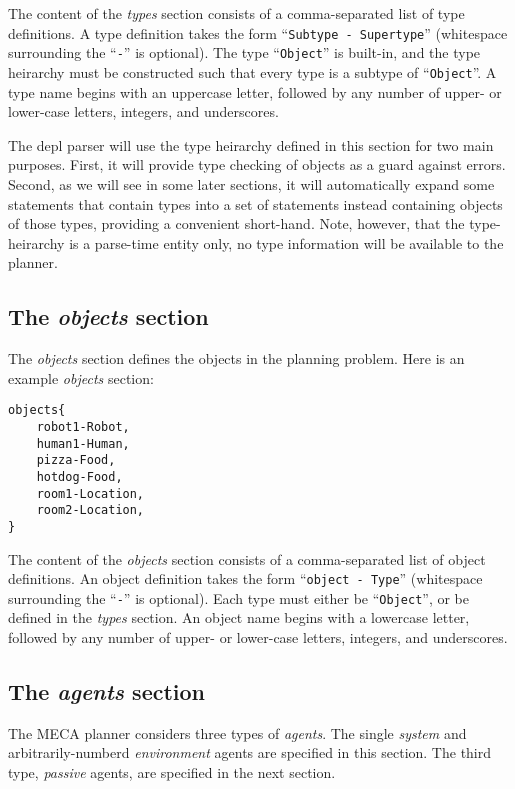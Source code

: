 \documentclass{article}
\begin{document}
The content of the \emph{types} section consists of a comma-separated list of
type definitions. A type definition takes the form
``\texttt{Subtype - Supertype}'' (whitespace surrounding the ``\texttt{-}'' is
optional). The type ``\texttt{Object}'' is built-in, and
the type heirarchy must be constructed such that every type is a subtype of
``\texttt{Object}''.  A type name begins with an uppercase letter, followed
by any number of upper- or lower-case letters, integers, and underscores.

The depl parser will use the type heirarchy defined in this section for two main
purposes. First, it will provide type checking of objects as a guard against errors.
Second, as we will see in some later sections, it will automatically expand some
statements that contain types into a set of statements instead containing
objects of those types, providing a convenient short-hand. Note, however, that
the type-heirarchy is a parse-time entity only, no type information will be
available to the planner.


\subsection{The \emph{objects} section}

The \emph{objects} section defines the objects in the planning problem.
Here is an example \emph{objects} section:
\begin{verbatim}
objects{
    robot1-Robot,
    human1-Human,
    pizza-Food,
    hotdog-Food,
    room1-Location,
    room2-Location,
}
\end{verbatim}

The content of the \emph{objects} section consists of a comma-separated list of
object definitions. An object definition takes the form ``\texttt{object -
Type}'' (whitespace surrounding the ``\texttt{-}'' is optional). Each type must
either be ``\texttt{Object}'', or be defined in the \emph{types} section.  An
object name begins with a lowercase letter, followed by any number of upper-
or lower-case letters, integers, and underscores.



\subsection{The \emph{agents} section}

The MECA planner considers three types of \emph{agents}. The single
\emph{system} and arbitrarily-numberd \emph{environment} agents are specified in
this section.  The third type, \emph{passive} agents, are specified in the next
section.
\end{document}
